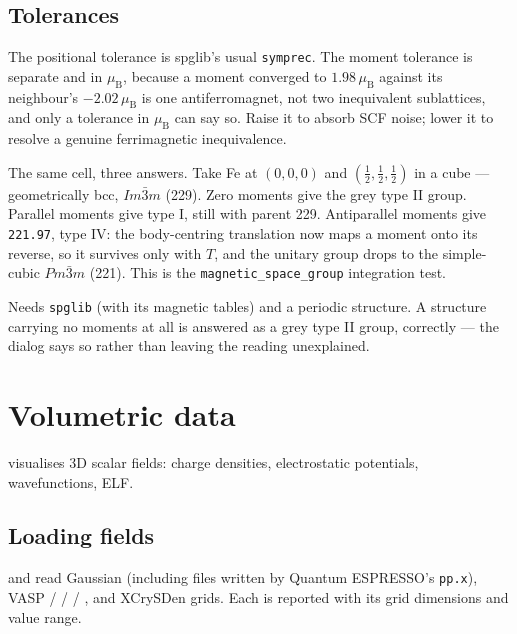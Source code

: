 \subsection{Tolerances}

The positional tolerance is spglib's usual \texttt{symprec}. The moment
tolerance is separate and in $\mu_\text{B}$, because a moment converged to
$1.98\,\mu_\text{B}$ against its neighbour's $-2.02\,\mu_\text{B}$ is one
antiferromagnet, not two inequivalent sublattices, and only a tolerance in
$\mu_\text{B}$ can say so. Raise it to absorb SCF noise; lower it to resolve a
genuine ferrimagnetic inequivalence.

\begin{caltip}
The same cell, three answers. Take Fe at $(0,0,0)$ and
$(\tfrac12,\tfrac12,\tfrac12)$ in a cube --- geometrically bcc,
$Im\bar{3}m$ (229). Zero moments give the grey type II group. Parallel
moments give type I, still with parent 229. Antiparallel moments give
\texttt{221.97}, type IV: the body-centring translation now maps a moment
onto its reverse, so it survives only with $T$, and the unitary group drops
to the simple-cubic $Pm\bar{3}m$ (221). This is the
\texttt{magnetic\_space\_group} integration test.
\end{caltip}

\begin{calwarn}
Needs \texttt{spglib} (with its magnetic tables) and a periodic structure.
A structure carrying no moments at all is answered as a grey type II group,
correctly --- the dialog says so rather than leaving the reading unexplained.
\end{calwarn}

\section{Volumetric data}
\label{sec:volumetric}

\menusep{} visualises 3D scalar fields:
charge densities, electrostatic potentials, wavefunctions, ELF.

\subsection{Loading fields}

 and  read Gaussian
 (including files written by Quantum ESPRESSO's \texttt{pp.x}),
VASP  /  /  / , and
XCrySDen  grids. Each is reported with its grid dimensions and
value range.


